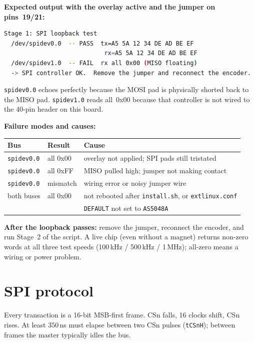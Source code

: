 \documentclass[11pt,a4paper]{article}
\begin{document}
\textbf{Expected output with the overlay active and the jumper on
pins~19/21:}
\begin{lstlisting}[language=bash]
Stage 1: SPI loopback test
  /dev/spidev0.0  -- PASS  tx=A5 5A 12 34 DE AD BE EF
                            rx=A5 5A 12 34 DE AD BE EF
  /dev/spidev1.0  -- FAIL  rx all 0x00 (MISO floating)
  -> SPI controller OK.  Remove the jumper and reconnect the encoder.
\end{lstlisting}
\texttt{spidev0.0} echoes perfectly because the MOSI pad is
physically shorted back to the MISO pad.  \texttt{spidev1.0} reads
all~0x00 because that controller is not wired to the 40-pin header on
this board.

\textbf{Failure modes and causes:}
\begin{center}\small
\begin{tabular}{lll}
\toprule
Bus & Result & Cause \\
\midrule
\texttt{spidev0.0} & all 0x00 & overlay not applied; SPI pads still tristated \\
\texttt{spidev0.0} & all 0xFF & MISO pulled high; jumper not making contact \\
\texttt{spidev0.0} & mismatch & wiring error or noisy jumper wire \\
both buses & all 0x00 & not rebooted after \texttt{install.sh}, or \texttt{extlinux.conf}\\
           &          & \texttt{DEFAULT} not set to \texttt{AS5048A} \\
\bottomrule
\end{tabular}
\end{center}

\textbf{After the loopback passes:} remove the jumper, reconnect the
encoder, and run Stage~2 of the script.  A live chip (even without a
magnet) returns non-zero words at all three test speeds
(100\,kHz / 500\,kHz / 1\,MHz); all-zero means a wiring or power problem.

\section{SPI protocol}
Every transaction is a 16-bit MSB-first frame.  CSn falls, 16 clocks
shift, CSn rises.  At least $350\,$ns must elapse between two CSn pulses
(\texttt{tCSnH}); between frames the master typically idles the bus.
\end{document}
